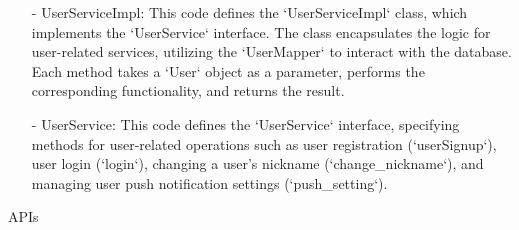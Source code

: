 \begin{enumerate}
    \item[-] UserServiceImpl: This code defines the `UserServiceImpl` class, which implements the `UserService` interface. The class encapsulates the logic for user-related services, utilizing the `UserMapper` to interact with the database. Each method takes a `User` object as a parameter, performs the corresponding functionality, and returns the result.\\
    \item[-] UserService: This code defines the `UserService` interface, specifying methods for user-related operations such as user registration (`userSignup`), user login (`login`), changing a user's nickname (`change\_nickname`), and managing user push notification settings (`push\_setting`).\\
\end{enumerate}
\item APIs
